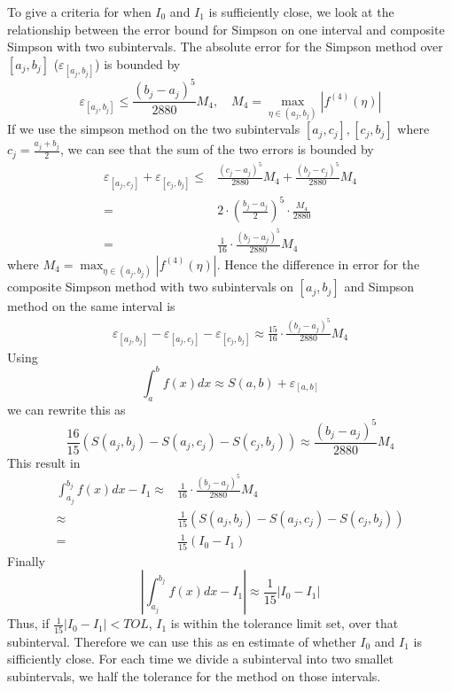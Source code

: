 \documentclass[12pt, a4paper,usenames,dvipsnames]{article}
\begin{document}
To give a criteria for when \(I_0\) and \(I_1\) is sufficiently close, we look at the relationship between the error bound for Simpson on one interval and composite Simpson with two subintervals. The absolute error for the Simpson method over \([a_j,b_j]\) (\(\varepsilon_{[a_j,b_j]}\)) is bounded by 
\[\varepsilon_{[a_j,b_j]}\leq \frac{(b_j-a_j)^5}{2880}M_4,\quad M_4=\max_{\eta\in(a_j,b_j)}|f^{(4)}(\eta)|\]
If we use the simpson method on the two subintervals \([a_j,c_j],[c_j,b_j]\) where \(c_j=\frac{a_j+b_j}{2}\), we can see that the sum of the two errors is bounded by 
\begin{equation*}
    \begin{split}
        \varepsilon_{[a_j,c_j]}+\varepsilon_{[c_j,b_j]}\leq& \frac{(c_j-a_j)^5}{2880}M_4+\frac{(b_j-c_j)^5}{2880}M_4\\
        =&2\cdot\left(\frac{b_j-a_j}{2}\right)^5\cdot\frac{M_4}{2880}\\
        =&\frac{1}{16}\cdot\frac{(b_j-a_j)^5}{2880}M_4
    \end{split}
\end{equation*}
where \(M_4=\max_{\eta \in (a_j,b_j)}|f^{(4)}(\eta)|\). Hence the difference in error for the composite Simpson method with two subintervals on \([a_j,b_j]\) and Simpson method on the same interval is
\begin{equation*}
    \begin{split}
        \varepsilon_{[a_j,b_j]}-\varepsilon_{[a_j,c_j]}-\varepsilon_{[c_j,b_j]}\approx \frac{15}{16}\cdot\frac{(b_j-a_j)^5}{2880}M_4
    \end{split}
\end{equation*}
Using 
\[\int_a^bf(x)dx\approx S(a,b)+\varepsilon_{[a,b]}\]
we can rewrite this as
\[\frac{16}{15}\left(S(a_j,b_j)-S(a_j,c_j)-S(c_j,b_j)\right)\approx\frac{(b_j-a_j)^5}{2880}M_4\]
This result in
\begin{equation*}
    \begin{split}
        \int_{a_j}^{b_j}f(x)dx-I_1\approx&\frac{1}{16}\cdot\frac{(b_j-a_j)^5}{2880}M_4\\
         \approx&\frac{1}{15}\left(S(a_j,b_j)-S(a_j,c_j)-S(c_j,b_j)\right)\\
         =&\frac{1}{15}(I_0-I_1)
    \end{split}
\end{equation*}
Finally
\[\left|\int_{a_j}^{b_j}f(x)dx-I_1\right|\approx\frac{1}{15}\left|I_0-I_1\right|\]
Thus, if \(\frac{1}{15}|I_0-I_1|<TOL\), \(I_1\) is within the tolerance limit set, over that subinterval. Therefore we can use this as en estimate of whether \(I_0\) and \(I_1\) is sifficiently close. For each time we divide a subinterval into two smallet subintervals, we half the tolerance for the method on those intervals.  
\end{document}
